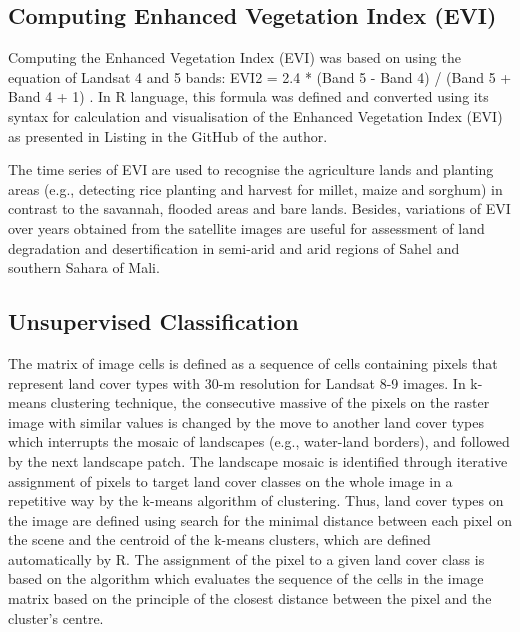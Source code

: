 \documentclass[12pt,a4paper,oneside]{article}
\def \newpar{\vspace{6pt}}
\begin{document}
\subsection*{Computing Enhanced Vegetation Index (EVI)}

\newpar Computing the Enhanced Vegetation Index (EVI) was based on using the equation of Landsat 4 and 5 bands: EVI2 = 2.4 * (Band 5 - Band 4) / (Band 5 + Band 4 + 1) \citep{HUETE2002195}. In R language, this formula was defined and converted using its syntax for calculation and visualisation of the Enhanced Vegetation Index (EVI) as presented in Listing in the GitHub of the author.

\newpar The time series of EVI are used to recognise the agriculture lands and planting areas (e.g., detecting rice planting and harvest for millet, maize and sorghum) in contrast to the savannah, flooded areas and bare lands. Besides, variations of EVI over years obtained from the satellite images are useful for assessment of land degradation and desertification in semi-arid and arid regions of Sahel and southern Sahara of Mali. 

\subsection*{Unsupervised Classification}

\newpar The matrix of image cells is defined as a sequence of cells containing pixels that represent land cover types with 30-m resolution for Landsat 8-9 images. In k-means clustering technique, the consecutive massive of the pixels on the raster image with similar values is changed by the move to another land cover types which interrupts the mosaic of landscapes (e.g., water-land borders), and followed by the next landscape patch. The landscape mosaic is identified through iterative assignment of pixels to target land cover classes  on the whole image in a repetitive way by the k-means algorithm of clustering. Thus, land cover types on the image are defined using search for the minimal distance between each pixel on the scene and the centroid of the k-means clusters, which are defined automatically by R. The assignment of the pixel to a given land cover class is based on the algorithm which evaluates the sequence of the cells in the image matrix based on the principle of the closest distance between the pixel and the cluster's centre.
\end{document}
